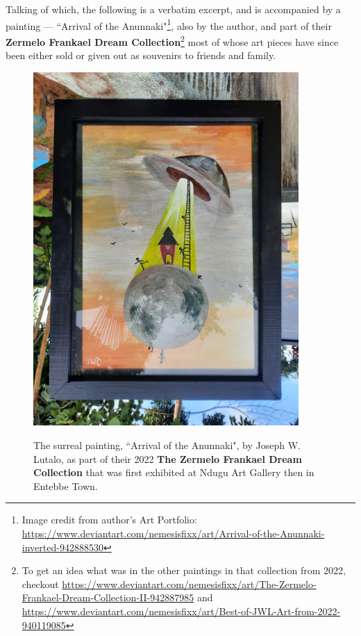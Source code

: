 \documentclass[a4paper, 18pt]{book} %
\begin{document}
\begin{appendices}
Talking of which, the following is a verbatim excerpt, and is accompanied by a painting --- ``Arrival of the Anunnaki"\footnote{Image credit from author's Art Portfolio: \url{https://www.deviantart.com/nemesisfixx/art/Arrival-of-the-Anunnaki-inverted-942888530}}, also by the author, and part of their \textbf{Zermelo Frankael Dream Collection}\footnote{To get an idea what was in the other paintings in that collection from 2022, checkout \url{https://www.deviantart.com/nemesisfixx/art/The-Zermelo-Frankael-Dream-Collection-II-942887985} and \url{https://www.deviantart.com/nemesisfixx/art/Best-of-JWL-Art-from-2022-940119085}} most of whose art pieces have since been either sold or given out as souvenirs to friends and family.


\begin{figure}[H]
  \begin{center}
   \includegraphics[trim=0cm 0cm 0cm 0cm, clip, width=0.9\textwidth,]{resources/images/annunaki.jpg}\\
   \caption{The surreal painting, ``Arrival of the Anunnaki", by Joseph W. Lutalo, as part of their 2022 \textbf{The Zermelo Frankael Dream Collection} that was first exhibited at Ndugu Art Gallery then in Entebbe Town.}
  \label{FIGANNUNAKI}
  \end{center}
\end{figure}



\end{appendices}
\end{document}
